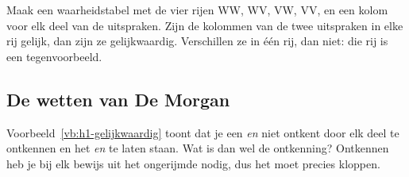 
\begin{werkwijze}
Maak een waarheidstabel met de vier rijen WW, WV, VW, VV, en een kolom voor elk deel van de uitspraken. Zijn de kolommen van de twee uitspraken in elke rij gelijk, dan zijn ze gelijkwaardig. Verschillen ze in één rij, dan niet: die rij is een tegenvoorbeeld.
\end{werkwijze}

\begin{oefeningen}
\end{oefeningen}

\subsection{De wetten van De Morgan}

Voorbeeld~\ref{vb:h1-gelijkwaardig} toont dat je een \textit{en} niet ontkent door elk deel te ontkennen en het \textit{en} te laten staan. Wat is dan wel de ontkenning? Ontkennen heb je bij elk bewijs uit het ongerijmde nodig, dus het moet precies kloppen.


